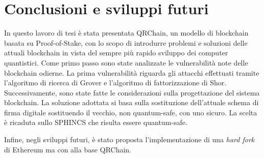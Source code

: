 \chapter{Conclusioni e sviluppi futuri}
In questo lavoro di tesi è stata presentata QRChain, un modello di blockchain basata su Proof-of-Stake, con lo scopo di introdurre problemi e soluzioni delle attuali blockchain in vista del sempre più rapido sviluppo dei computer quantistici. Come primo passo sono state analizzate le vulnerabilità note delle blockchain odierne. La prima vulnerabilità riguarda gli attacchi effettuati tramite l'algoritmo di ricerca di Grover e l'algoritmo di fattorizzazione di Shor. Successivamente, sono state fatte le considerazioni sulla progettazione del sistema blockchain. La soluzione adottata si basa sulla sostituzione dell'attuale schema di firma digitale sostituendo il vecchio, non quantum-safe, con uno sicuro. La scelta è ricaduta sullo SPHINCS che risulta essere quantum-safe.

Infine, negli sviluppi futuri, è stato proposta l'implementazione di una \textit{hard fork} di Ethereum ma con alla base QRChain.